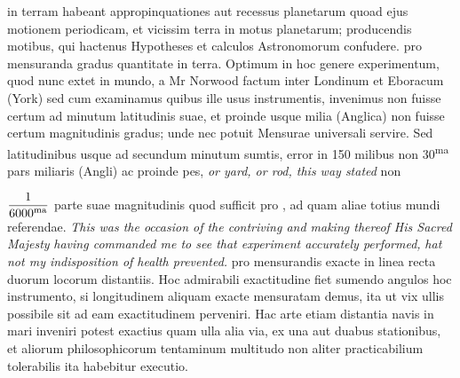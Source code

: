 \pstart {}\textsuperscript{}  in terram habeant appropinquationes aut recessus planetarum quoad ejus motionem periodicam, et vicissim terra in motus planetarum; producendis motibus, qui hactenus Hypotheses et calculos Astronomorum confudere. \textsuperscript{} pro mensuranda gradus quantitate in terra. Optimum in hoc genere experimentum, quod nunc extet in mundo,  a Mr Norwood\protect{} factum inter Londinum\protect{} et Eboracum (York)\protect{} sed cum examinamus quibus ille usus instrumentis, invenimus non fuisse certum ad minutum  latitudinis suae, et proinde  usque milia (Anglica) non fuisse certum magnitudinis gradus; unde nec potuit Mensurae universali servire. Sed latitudinibus usque ad secundum minutum sumtis, error in 150 milibus non  30\textsuperscript{ma} pars miliaris (Angli) ac proinde pes, \textit{or yard, or rod, this way stated} non  \rule[-4mm]{0mm}{10mm}$\displaystyle\frac{1}{6000\text{\textsuperscript{ma}}}$ parte suae magnitudinis quod sufficit pro , ad quam aliae totius mundi referendae. \textit{This was the occasion of the contriving and making thereof His Sacred Majesty}\protect{} \textit{having commanded me to see that experiment accurately performed,} \textit{hat not my indisposition of health prevented.} 
\pend 
\pstart {}\textsuperscript{} pro mensurandis exacte in linea recta duorum locorum distantiis. Hoc admirabili exactitudine fiet sumendo angulos hoc instrumento, si longitudinem aliquam exacte mensuratam demus, ita ut vix ullis  possibile sit ad eam exactitudinem perveniri. Hac arte etiam distantia navis in mari inveniri potest exactius quam ulla alia via, ex una aut duabus stationibus, et aliorum philosophicorum tentaminum multitudo non aliter practicabilium tolerabilis ita habebitur executio. 
\pend 
\count{}
\count{}
\count{} 
\pstart 